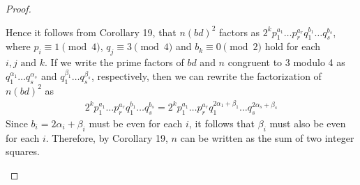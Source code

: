 \documentclass[10pt]{amsart}
\begin{document}
\begin{thm}
\begin{proof}
\begin{alphaenum}
      Hence it follows from Corollary 19, that $n(bd)^2$ factors as $2^kp_1^{a_1} \ldots p_r^{a_r}q_1^{b_1} \ldots q_s^{b_s}$, where $p_i \equiv 1 \pmod{4}$,  $q_j \equiv 3 \pmod{4}$ and $b_k \equiv 0 \pmod{2}$ hold for each $i, j \text{ and } k$.
      If we write the prime factors of $bd$ and $n$ congruent to 3 modulo 4 as $q_1^{\alpha_1} \ldots q_s^{\alpha_s}$ and $q_1^{\beta_1} \ldots q_s^{\beta_s}$, respectively, then we can rewrite the factorization of $n(bd)^2$ as
      \begin{align*}
        2^kp_1^{a_1} \ldots p_r^{a_r}q_1^{b_1} \ldots q_s^{b_s} = 2^kp_1^{a_1} \ldots p_r^{a_r}q_1^{2\alpha_1 + \beta_1} \ldots q_s^{2\alpha_s + \beta_s}
      \end{align*}
      Since $b_i = 2\alpha_i + \beta_i$ must be even for each $i$, it follows that $\beta_i$ must also be even for each $i$.
      Therefore, by Corollary 19, $n$ can be written as the sum of two integer squares.
    \end{alphaenum}
  \end{proof}
\end{thm}
\end{document}
